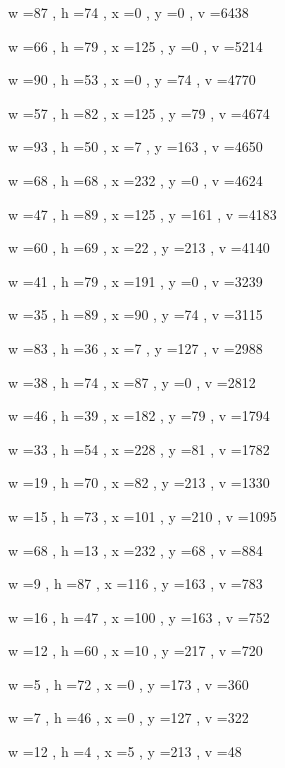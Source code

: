 \documentclass[11pt]{article}
\begin{document}
w =87 , h =74 , x =0 , y =0 , v =6438
\par
w =66 , h =79 , x =125 , y =0 , v =5214
\par
w =90 , h =53 , x =0 , y =74 , v =4770
\par
w =57 , h =82 , x =125 , y =79 , v =4674
\par
w =93 , h =50 , x =7 , y =163 , v =4650
\par
w =68 , h =68 , x =232 , y =0 , v =4624
\par
w =47 , h =89 , x =125 , y =161 , v =4183
\par
w =60 , h =69 , x =22 , y =213 , v =4140
\par
w =41 , h =79 , x =191 , y =0 , v =3239
\par
w =35 , h =89 , x =90 , y =74 , v =3115
\par
w =83 , h =36 , x =7 , y =127 , v =2988
\par
w =38 , h =74 , x =87 , y =0 , v =2812
\par
w =46 , h =39 , x =182 , y =79 , v =1794
\par
w =33 , h =54 , x =228 , y =81 , v =1782
\par
w =19 , h =70 , x =82 , y =213 , v =1330
\par
w =15 , h =73 , x =101 , y =210 , v =1095
\par
w =68 , h =13 , x =232 , y =68 , v =884
\par
w =9 , h =87 , x =116 , y =163 , v =783
\par
w =16 , h =47 , x =100 , y =163 , v =752
\par
w =12 , h =60 , x =10 , y =217 , v =720
\par
w =5 , h =72 , x =0 , y =173 , v =360
\par
w =7 , h =46 , x =0 , y =127 , v =322
\par
w =12 , h =4 , x =5 , y =213 , v =48
\par
\newpage
\end{document}
